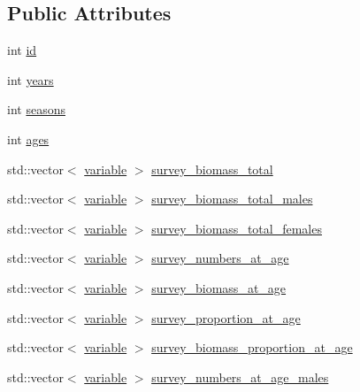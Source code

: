 \subsection*{Public Attributes}
\begin{DoxyCompactItemize}
\item 
int \hyperlink{structmas_1_1_survey_a0e0e24656b837749042a9ed368a61aa6}{id}
\item 
int \hyperlink{structmas_1_1_survey_a62db9142400baea1e578c34ffa423d97}{years}
\item 
int \hyperlink{structmas_1_1_survey_a823552ecb1c304d152b0befca7465394}{seasons}
\item 
int \hyperlink{structmas_1_1_survey_a00478a5d1bf1272d220efde6560efe06}{ages}
\item 
std\-::vector$<$ \hyperlink{structmas_1_1_survey_ae91896013e1a3403f7e3d79b1f845966}{variable} $>$ \hyperlink{structmas_1_1_survey_ae17e461c7ac75c48a2dd5cd80d17d485}{survey\-\_\-biomass\-\_\-total}
\item 
std\-::vector$<$ \hyperlink{structmas_1_1_survey_ae91896013e1a3403f7e3d79b1f845966}{variable} $>$ \hyperlink{structmas_1_1_survey_ab6e2c544df4e59bc1b4169132dc598b6}{survey\-\_\-biomass\-\_\-total\-\_\-males}
\item 
std\-::vector$<$ \hyperlink{structmas_1_1_survey_ae91896013e1a3403f7e3d79b1f845966}{variable} $>$ \hyperlink{structmas_1_1_survey_a2a3551f2c4083ca4ec39f40d2afc3dc5}{survey\-\_\-biomass\-\_\-total\-\_\-females}
\item 
std\-::vector$<$ \hyperlink{structmas_1_1_survey_ae91896013e1a3403f7e3d79b1f845966}{variable} $>$ \hyperlink{structmas_1_1_survey_a84b8d86778e01e5deae1b89b21dd9101}{survey\-\_\-numbers\-\_\-at\-\_\-age}
\item 
std\-::vector$<$ \hyperlink{structmas_1_1_survey_ae91896013e1a3403f7e3d79b1f845966}{variable} $>$ \hyperlink{structmas_1_1_survey_a80b8b0dec9dfd6cf78ab807eaa1aa446}{survey\-\_\-biomass\-\_\-at\-\_\-age}
\item 
std\-::vector$<$ \hyperlink{structmas_1_1_survey_ae91896013e1a3403f7e3d79b1f845966}{variable} $>$ \hyperlink{structmas_1_1_survey_aea931b487380dc2188543c50c50e101c}{survey\-\_\-proportion\-\_\-at\-\_\-age}
\item 
std\-::vector$<$ \hyperlink{structmas_1_1_survey_ae91896013e1a3403f7e3d79b1f845966}{variable} $>$ \hyperlink{structmas_1_1_survey_a6f6ec205376fb1a8d629117bd8e4a1d6}{survey\-\_\-biomass\-\_\-proportion\-\_\-at\-\_\-age}
\item 
std\-::vector$<$ \hyperlink{structmas_1_1_survey_ae91896013e1a3403f7e3d79b1f845966}{variable} $>$ \hyperlink{structmas_1_1_survey_a2727239747456825885406d15a07c08d}{survey\-\_\-numbers\-\_\-at\-\_\-age\-\_\-males}

\end{DoxyCompactItemize}
